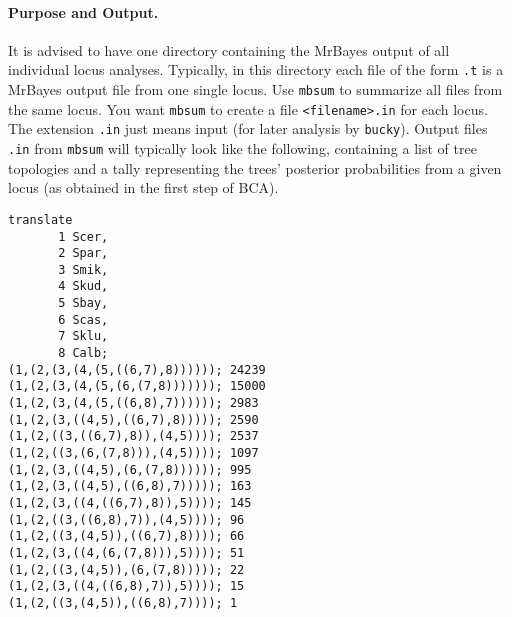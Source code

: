 \documentclass[12pt,english,final,letterpaper]{article}
\begin{document}
\paragraph{Purpose and Output.}
It is advised to have one directory containing the MrBayes output 
of all individual locus analyses. Typically, in this directory
each file of the form {\tt *.t} is a MrBayes output file from one 
single locus.  Use {\tt mbsum} to summarize all files from the
same locus. You want {\tt mbsum} to create a file 
\verb+<filename>.in+ for each locus. 
The extension \verb+.in+
just means input (for later analysis by {\tt bucky}). 
Output files {\tt *.in} from {\tt mbsum} will typically look like the following,
containing a list of tree topologies and a tally representing the trees' posterior
probabilities from a given locus (as obtained in the first step of BCA).
{\small
\begin{verbatim}
translate
       1 Scer,
       2 Spar,
       3 Smik,
       4 Skud,
       5 Sbay,
       6 Scas,
       7 Sklu,
       8 Calb;
(1,(2,(3,(4,(5,((6,7),8)))))); 24239
(1,(2,(3,(4,(5,(6,(7,8))))))); 15000
(1,(2,(3,(4,(5,((6,8),7)))))); 2983
(1,(2,(3,((4,5),((6,7),8))))); 2590
(1,(2,((3,((6,7),8)),(4,5)))); 2537
(1,(2,((3,(6,(7,8))),(4,5)))); 1097
(1,(2,(3,((4,5),(6,(7,8)))))); 995
(1,(2,(3,((4,5),((6,8),7))))); 163
(1,(2,(3,((4,((6,7),8)),5)))); 145
(1,(2,((3,((6,8),7)),(4,5)))); 96
(1,(2,((3,(4,5)),((6,7),8)))); 66
(1,(2,(3,((4,(6,(7,8))),5)))); 51
(1,(2,((3,(4,5)),(6,(7,8))))); 22
(1,(2,(3,((4,((6,8),7)),5)))); 15
(1,(2,((3,(4,5)),((6,8),7)))); 1
\end{verbatim}}
 
\end{document}
